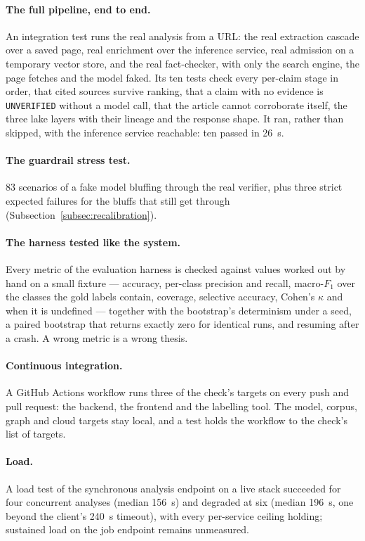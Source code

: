 \paragraph{The full pipeline, end to end.} An integration test runs the
real analysis from a URL: the real extraction cascade over a saved
page, real enrichment over the inference service, real admission on a
temporary vector store, and the real fact-checker, with only the search
engine, the page fetches and the model faked. Its ten tests check every
per-claim stage in order, that cited sources survive ranking, that a
claim with no evidence is \texttt{UNVERIFIED} without a model call,
that the article cannot corroborate itself, the three lake layers with
their lineage and the response shape. It ran, rather than skipped,
with the inference service reachable: ten passed in 26~s.

\paragraph{The guardrail stress test.} 83 scenarios of a fake model
bluffing through the real verifier, plus three strict expected failures
for the bluffs that still get through
(Subsection~\ref{subsec:recalibration}).

\paragraph{The harness tested like the system.} Every metric of the
evaluation harness is checked against values worked out by hand on a
small fixture --- accuracy, per-class precision and recall, macro-$F_1$
over the classes the gold labels contain, coverage, selective accuracy,
Cohen's $\kappa$ and when it is undefined --- together with the
bootstrap's determinism under a seed, a paired bootstrap that returns
exactly zero for identical runs, and resuming after a crash. A wrong
metric is a wrong thesis.

\paragraph{Continuous integration.} A GitHub Actions workflow runs
three of the check's targets on every push and pull request: the
backend, the frontend and the labelling tool. The model, corpus, graph
and cloud targets stay local, and a test holds the workflow to the
check's list of targets.

\paragraph{Load.} A load test of the synchronous analysis endpoint on a
live stack succeeded for four concurrent analyses (median 156~s) and
degraded at six (median 196~s, one beyond the client's 240~s timeout),
with every per-service ceiling holding; sustained load on the job
endpoint remains unmeasured.

